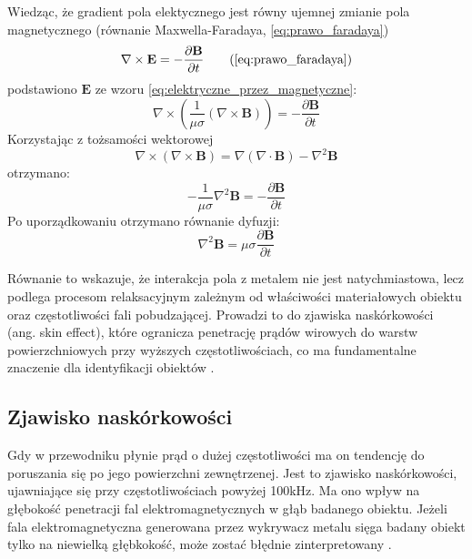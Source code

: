Wiedząc, że gradient pola elektycznego jest równy ujemnej zmianie pola magnetycznego (równanie Maxwella-Faradaya, \ref{eq:prawo_faradaya})
\begin{equation}
\nabla \times \mathbf{E} = - \frac{\partial \mathbf{B}}{\partial t}
      \tag{\ref{eq:prawo_faradaya}}
\end{equation}
podstawiono $\mathbf{E}$ ze wzoru \ref{eq:elektryczne_przez_magnetyczne}:
\begin{equation}
    \nabla \times \left( \frac{1}{\mu \sigma} (\nabla \times \mathbf{B}) \right) = - \frac{\partial \mathbf{B}}{\partial t}
    \label{eq:test}
\end{equation}
Korzystając z tożsamości wektorowej
\begin{equation}
    \nabla \times (\nabla \times \mathbf{B}) = \nabla(\nabla \cdot \mathbf{B}) - \nabla^2 \mathbf{B}
    \label{eq:tozsamosc_wektorowa}
\end{equation}
otrzymano:
\begin{equation}
    - \frac{1}{\mu \sigma} \nabla^2 \mathbf{B} = - \frac{\partial \mathbf{B}}{\partial t}
    \label{eq:diffused_dirty}
\end{equation}
Po uporządkowaniu otrzymano równanie dyfuzji:
\begin{equation}
    \label{eq:diffused}
    \nabla^2 \mathbf{B} = \mu \sigma \frac{\partial \mathbf{B}}{\partial t}
\end{equation}

Równanie to wskazuje, że interakcja pola z metalem nie jest natychmiastowa, lecz podlega procesom relaksacyjnym zależnym od właściwości materiałowych obiektu oraz częstotliwości fali pobudzającej. Prowadzi to do zjawiska naskórkowości (ang. skin effect), które ogranicza penetrację prądów wirowych do warstw powierzchniowych przy wyższych częstotliwościach, co ma fundamentalne znaczenie dla identyfikacji obiektów \cite{moreland2024inside}.

\subsection{Zjawisko naskórkowości}

Gdy w przewodniku płynie prąd o dużej częstotliwości ma on tendencję do poruszania się po jego powierzchni zewnętrzenej. Jest to zjawisko naskórkowości, ujawniające się przy częstotliwościach powyżej 100kHz.
Ma ono wpływ na głębokość penetracji fal elektromagnetycznych w głąb badanego obiektu. Jeżeli fala elektromagnetyczna generowana przez wykrywacz metalu sięga badany obiekt tylko na niewielką głębkokość, może zostać błędnie zinterpretowany \cite{moreland2024inside}.

